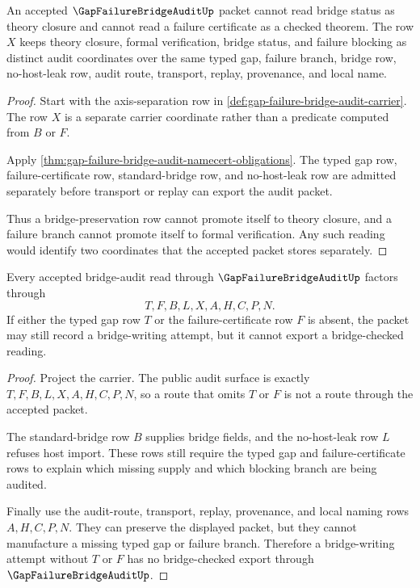 \begin{theorem}
\label{thm:gap-failure-bridge-audit-axis-separation}
An accepted $\GapFailureBridgeAuditUp$ packet cannot read bridge status as theory closure and cannot read a failure certificate as a checked theorem. The row $X$ keeps theory closure, formal verification, bridge status, and failure blocking as distinct audit coordinates over the same typed gap, failure branch, bridge row, no-host-leak row, audit route, transport, replay, provenance, and local name.
\end{theorem}
\begin{proof}
Start with the axis-separation row in \autoref{def:gap-failure-bridge-audit-carrier}. The row $X$ is a separate carrier coordinate rather than a predicate computed from $B$ or $F$.

Apply \autoref{thm:gap-failure-bridge-audit-namecert-obligations}. The typed gap row, failure-certificate row, standard-bridge row, and no-host-leak row are admitted separately before transport or replay can export the audit packet.

Thus a bridge-preservation row cannot promote itself to theory closure, and a failure branch cannot promote itself to formal verification. Any such reading would identify two coordinates that the accepted packet stores separately.
\end{proof}

\begin{theorem}
\label{thm:gap-failure-bridge-audit-nonescape}
Every accepted bridge-audit read through $\GapFailureBridgeAuditUp$ factors through
$$
T,F,B,L,X,A,H,C,P,N.
$$
If either the typed gap row $T$ or the failure-certificate row $F$ is absent, the packet may still record a bridge-writing attempt, but it cannot export a bridge-checked reading.
\end{theorem}
\begin{proof}
Project the carrier. The public audit surface is exactly $T,F,B,L,X,A,H,C,P,N$, so a route that omits $T$ or $F$ is not a route through the accepted packet.

The standard-bridge row $B$ supplies bridge fields, and the no-host-leak row $L$ refuses host import. These rows still require the typed gap and failure-certificate rows to explain which missing supply and which blocking branch are being audited.

Finally use the audit-route, transport, replay, provenance, and local naming rows $A,H,C,P,N$. They can preserve the displayed packet, but they cannot manufacture a missing typed gap or failure branch. Therefore a bridge-writing attempt without $T$ or $F$ has no bridge-checked export through $\GapFailureBridgeAuditUp$.
\end{proof}

